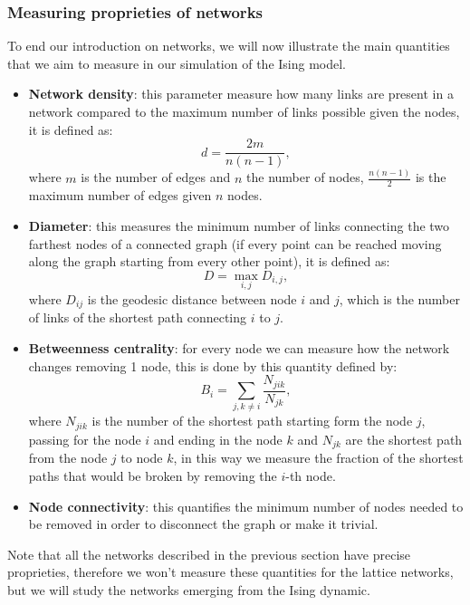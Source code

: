 \subsubsection{Measuring proprieties of networks}
To end our introduction on networks, we will now illustrate the main quantities that we aim to measure in our simulation of the Ising model.
\begin{itemize}
    \item \textbf{Network density}: this parameter measure how many links are present in a network compared to the maximum number of links possible given the nodes, it is defined as:
    \begin{equation}
        d=\frac{2m}{n(n-1)},\label{density}
    \end{equation}
    where $m$ is the number of edges and $n$ the number of nodes, $\frac{n(n-1)}{2}$ is the maximum number of edges given $n$ nodes.
    \item \textbf{Diameter}: this measures the minimum number of links connecting the two farthest nodes of a connected graph (if every point can be reached moving along the graph starting from every other point), it is defined as:
    \begin{equation}
        D=\max_{i,j} D_{i,j},\label{diameter}
    \end{equation}
    where $D_{ij}$ is the geodesic distance between node $i$ and $j$, which is the number of links of the shortest path connecting $i$ to $j$.
    \item \textbf{Betweenness centrality}: for every node we can measure how the network changes removing 1 node, this is done by this quantity defined by:
    \begin{equation}
        \label{Betweenness centrality}
        B_i=\sum_{j,k\neq i}\frac{N_{jik}}{N_{jk}},
    \end{equation}
    where $N_{jik}$ is the number of the shortest path starting form the node $j$, passing for the node $i$ and ending in the node $k$ and $N_{jk}$ are the shortest path from the node $j$ to node $k$, in this way we measure the fraction of the shortest paths that would be broken by removing the $i$-th node.
    \item \textbf{Node connectivity}: this quantifies the minimum number of nodes needed to be removed in order to disconnect the graph or make it trivial.
\end{itemize}
Note that all the networks described in the previous section have precise proprieties, therefore we won't measure these quantities for the lattice networks, but we will study the networks emerging from the Ising dynamic.

